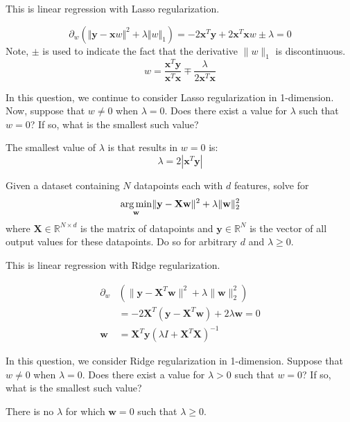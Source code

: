This is linear regression with Lasso regularization.

\begin{subsolution}
 \begin{equation}
   \partial_w(\Vert\mathbf{y} - \mathbf{x}w\Vert^2 + \lambda\Vert w\Vert_1) = -2\mathbf{x}^T\mathbf{y}+2\mathbf{x}^T\mathbf{x}w\pm\lambda = 0
 \end{equation}
 Note, $\pm$ is used to indicate the fact that the derivative $\|w\|_1$ is discontinuous.
 \begin{equation}
  w = \frac{\mathbf{x}^T\mathbf{y}}{\mathbf{x}^T\mathbf{x}}\mp\frac{\lambda}{2\mathbf{x}^T\mathbf{x}}
\end{equation}
\end{subsolution}

\subproblem
In this question, we continue to consider Lasso regularization in 1-dimension. Now, suppose that $w \neq 0$ when $\lambda = 0$. Does there exist a value for $\lambda$ such that $w = 0$? If so, what is the smallest such value?

\begin{subsolution}
  The smallest value of $\lambda$ is that results in $w=0$ is:
  \begin{equation}
    \lambda = 2|\mathbf{x}^T\mathbf{y}|
  \end{equation}
\end{subsolution}

\problem[9]
\subproblem
Given a dataset containing $N$ datapoints each with $d$ features, solve for
\[\underset{\mathbf{w}}{\operatorname{arg\,min}} \Vert\mathbf{y} - \mathbf{X}\mathbf{w}\Vert^2 + \lambda\Vert\mathbf{w}\Vert_2^2
\]
where $\mathbf{X} \in \mathbb{R}^{N \times d}$ is the matrix of datapoints and $\mathbf{y} \in \mathbb{R}^N$ is the  vector of all output values for these datapoints. Do so for arbitrary $d$ and $\lambda \geq 0$.

This is linear regression with Ridge regularization.

\begin{subsolution}
  \begin{align}
    \partial_w &\left( \|\textbf{y} - \textbf{X}^{T}\textbf{w}\|^2 + \lambda\|\textbf{w}\|_2^2\right) \\
    &= -2\textbf{X}^T (\textbf{y} - \textbf{X}^{T}\textbf{w}) + 2\lambda\textbf{w} = 0 \\
  \textbf{w} &= \textbf{X}^T\textbf{y}(\lambda I + \textbf{X}^T\textbf{X})^{-1}
    \end{align} 
\end{subsolution}

\subproblem In this question, we consider Ridge regularization in 1-dimension. Suppose that $w \neq 0$ when $\lambda = 0$. Does there exist a value for $\lambda > 0$ such that $w = 0$? If so, what is the smallest such value?

\begin{subsolution}
 There is no $\lambda$ for which $\mathbf{w}=0$ such that $\lambda\geq 0$.
\end{subsolution}



